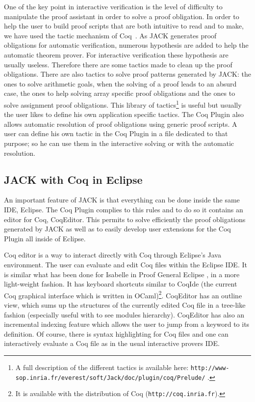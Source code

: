 One of the key point in interactive verification is the level of difficulty
to manipulate the proof assistant in order to solve a proof obligation.
In order to help the user to build proof scripts that are both intuitive
to read and to make, we have used the tactic mechanism of Coq~\cite{DEL-00-LTAC}.
As JACK generates proof obligations for automatic verification, numerous hypothesis are 
added to help the automatic theorem prover. For interactive verification 
these hypothesis are usually useless. Therefore there are some tactics made
to clean up the proof obligations. There are also tactics to solve proof patterns
generated by JACK: the ones to solve arithmetic goals,
when the solving of a proof leads to an absurd case, the ones to help solving
array specific proof obligations and the ones to solve assignment proof obligations.
This library of tactics\footnote{
A full description of the different tactics is available here:
\texttt{http://www-sop.inria.fr/everest/soft/Jack/doc/plugin/coq/Prelude/} .}
is useful but usually the user likes to define his own application
specific tactics. The Coq Plugin also allows automatic resolution of proof obligations
using generic proof scripts.
A user can define his own tactic in the Coq Plugin in a file 
dedicated to that purpose; so he can use them in the interactive solving or with the 
automatic resolution.








\subsection{JACK with Coq in Eclipse}
An important feature of JACK is that everything can be done inside the same IDE, Eclipse.
The Coq Plugin complies to this rules and to do so it contains an editor for Coq, 
CoqEditor. This permits to solve efficiently the proof obligations generated by JACK as
well as to easily develop user extensions for the Coq Plugin all inside of Eclipse.

Coq editor is a way to interact directly with Coq through Eclipse's Java 
environment. The user can evaluate and edit Coq files within the
Eclipse IDE. It is similar what has been done for Isabelle in 
Proof General Eclipse \cite{WintersteinAL05}, in a more light-weight fashion.
It has keyboard shortcuts similar to CoqIde (the current Coq graphical
interface which is written in OCaml)\footnote{It is available with the
distribution of Coq (\texttt{http://coq.inria.fr}).}. 
CoqEditor has an outline view,
which sums up the structures of the currently edited Coq file 
in a tree-like fashion (especially useful with to see modules hierarchy). 
CoqEditor has also an incremental indexing feature which allows the user
to jump from a keyword to its definition.
Of course, there is syntax highlighting for Coq files 
and one can interactively evaluate a Coq file
as in the usual interactive provers IDE.


